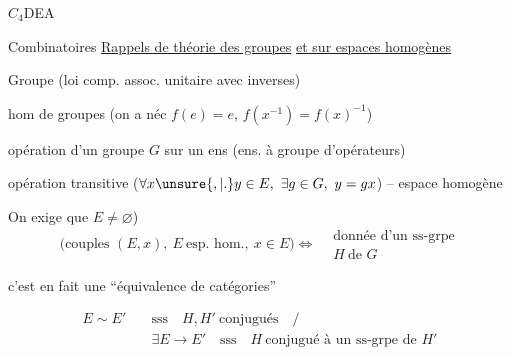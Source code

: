 $C_{4}$\qquad DEA

 Combinatoires
\uline{Rappels de théorie des groupes} \uline{et sur espaces homogènes}

Groupe (loi comp. assoc. unitaire avec inverses)

hom de groupes (on a néc $f(e)=e$, $f(x^{-1})=f(x)^{-1}$)

opération d'un groupe $G$ sur un ens (ens. à groupe d'opérateurs)

opération transitive ($\forall x\unsure{,|\mathord{.}}y\in E,\ \exists g\in G,\ y=gx$) -- espace homogène

On exige  que $E\ne\varnothing$)
\[
\bigl(\text{couples }(E,x),\ E\ \text{esp. hom.},\ x\in E\bigr)
\Longleftrightarrow
\begin{aligned}&\text{donnée d'un ss-grpe}\\&H\ \text{de }G\end{aligned}
\]

c'est en fait une ``équivalence de catégories''

{\small
{}}
{\small
\[
\begin{aligned}
E\sim E' \quad &\text{sss}\quad H,H'\ \text{conjugués}\quad \big/\\[-2pt]
&\exists E\to E'\quad\text{sss}\quad H\ \text{conjugué à un ss-grpe de }H'
\end{aligned}
\]}

